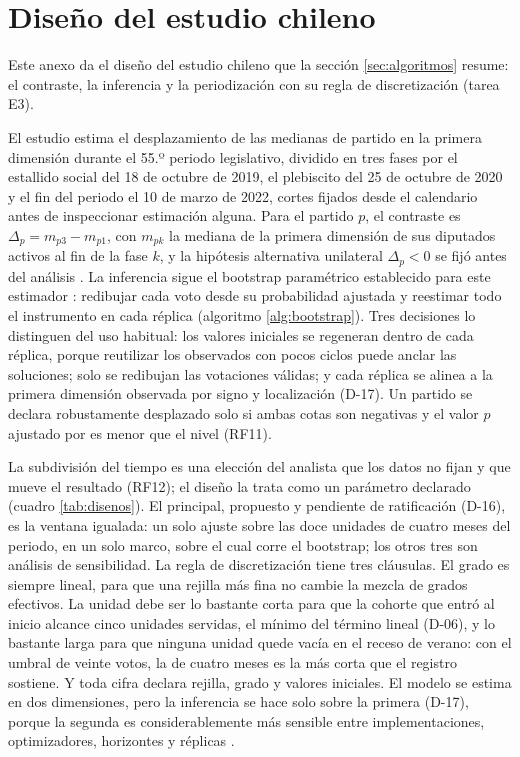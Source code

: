 \chapter{Diseño del estudio chileno}
\label{anexo:chile}

Este anexo da el diseño del estudio chileno que la sección \ref{sec:algoritmos} resume: el
contraste, la inferencia y la periodización con su regla de discretización (tarea E3).

El estudio estima el desplazamiento de las medianas de partido en la primera dimensión durante
el 55.º periodo legislativo, dividido en tres fases por el estallido social del 18 de octubre
de 2019, el plebiscito del 25 de octubre de 2020 y el fin del periodo el 10 de marzo de 2022,
cortes fijados desde el calendario antes de inspeccionar estimación alguna. Para el partido
$p$, el contraste es $\Delta_p = m_{p3} - m_{p1}$, con $m_{pk}$ la mediana de la primera
dimensión de sus diputados activos al fin de la fase $k$, y la hipótesis alternativa
unilateral $\Delta_p < 0$ se fijó antes del análisis \parencite{nieves2026jcc}. La inferencia
sigue el bootstrap paramétrico establecido para este estimador
\parencite{lewis2004measuring,carroll2009measuring}: redibujar cada voto desde su probabilidad
ajustada y reestimar todo el instrumento en cada réplica (algoritmo \ref{alg:bootstrap}). Tres
decisiones lo distinguen del uso habitual: los valores iniciales se regeneran dentro de cada
réplica, porque reutilizar los observados con pocos ciclos puede anclar las soluciones; solo
se redibujan las votaciones válidas; y cada réplica se alinea a la primera dimensión observada
por signo y localización (D-17). Un partido se declara robustamente desplazado solo si ambas
cotas son negativas y el valor $p$ ajustado por \textcite{holm1979simple} es menor que el
nivel (RF11).

La subdivisión del tiempo es una elección del analista que los datos no fijan y que mueve el
resultado (RF12); el diseño la trata como un parámetro declarado (cuadro \ref{tab:disenos}).
El principal, propuesto y pendiente de ratificación (D-16), es la ventana igualada: un solo
ajuste sobre las doce unidades de cuatro meses del periodo, en un solo marco, sobre el cual
corre el bootstrap; los otros tres son análisis de sensibilidad. La regla de discretización
tiene tres cláusulas. El grado es siempre lineal, para que una rejilla más fina no cambie la
mezcla de grados efectivos. La unidad debe ser lo bastante corta para que la cohorte que entró
al inicio alcance cinco unidades servidas, el mínimo del término lineal (D-06), y lo bastante
larga para que ninguna unidad quede vacía en el receso de verano: con el umbral de veinte
votos, la de cuatro meses es la más corta que el registro sostiene. Y toda cifra declara
rejilla, grado y valores iniciales. El modelo se estima en dos dimensiones, pero la
inferencia se hace solo sobre la primera (D-17), porque la segunda es considerablemente más
sensible entre implementaciones, optimizadores, horizontes y réplicas
\parencite{nieves2026jcc}.

